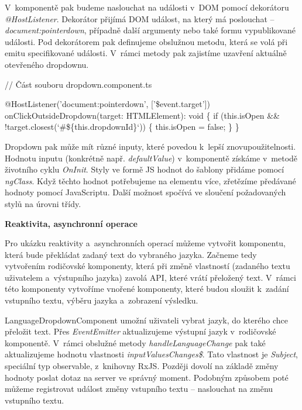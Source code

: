 V~komponentě pak budeme naslouchat na události v~DOM pomocí dekorátoru \emph{@HostListener}. 
Dekorátor přijímá DOM událost, na který má poslouchat -- \emph{document:pointerdown}, případně další argumenty nebo také formu vypublikované události. 
Pod dekorátorem pak definujeme obslužnou metodu, která se volá při emitu specifikované události. V~rámci metody pak zajistíme uzavření aktuálně otevřeného dropdownu.

\begin{prog}
// Část souboru dropdown.component.ts

@HostListener('document:pointerdown', ['\$event.target'])
onClickOutsideDropdown(target: HTMLElement): void \{
  if (this.isOpen && !target.closest(`#\$\{this.dropdownId\}`)) \{
    this.isOpen = false;
  \}
\}
\end{prog}

Dropdown pak může mít různé inputy, které povedou k~lepší znovupoužitelnosti. Hodnotu inputu (konkrétně např. \emph{defaultValue}) v~komponentě získáme v~metodě životního cyklu \emph{OnInit}. 
Styly ve formě JS hodnot do šablony přidáme pomocí \emph{ngClass}. Když těchto hodnot potřebujeme na elementu více, zřetězíme předávané hodnoty pomocí JavaScriptu. 
Další možnost spočívá ve sloučení požadovaných stylů na úrovni třídy.

\begin{flushleft}
  \textbf{Reaktivita, asynchronní operace}
\end{flushleft}

Pro ukázku reaktivity a~asynchronních operací můžeme vytvořit komponentu, která bude překládat zadaný text do vybraného jazyka. 
Začneme tedy vytvořením rodičovské komponenty, která při změně vlastností (zadaného textu uživatelem a~výstupního jazyka) zavolá API, které vrátí přeložený text. 
V~rámci této komponenty vytvoříme vnořené komponenty, které budou sloužit k~zadání vstupního textu, výběru jazyka a~zobrazení výsledku. 

LanguageDropdownComponent umožní uživateli vybrat jazyk, do kterého chce přeložit text. 
Přes \emph{EventEmitter} aktualizujeme výstupní jazyk v~rodičovské komponentě. V~rámci obslužné metody \emph{handleLanguageChange} pak také aktualizujeme hodnotu vlastnosti \emph{inputValuesChanges\$}.
Tato vlastnost je \emph{Subject}, speciální typ observable, z~knihovny RxJS. Později dovolí na základě změny hodnoty poslat dotaz na server ve správný moment. 
Podobným způsobem poté můžeme registrovat událost změny vstupního textu -- naslouchat na změnu vstupního textu.

